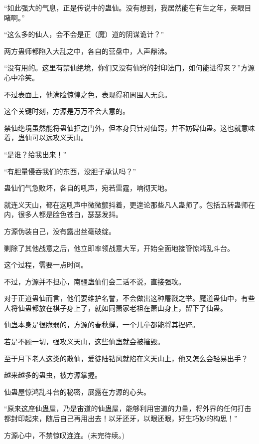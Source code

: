 \begin{this_body}
“如此强大的气息，正是传说中的蛊仙。没有想到，我居然能在有生之年，亲眼目睹啊。”

“这么多的仙人，会不会是正（魔）道的阴谋诡计？”

两方蛊师都陷入大乱之中，各自的营盘中，人声鼎沸。

“没有用的。这里有禁仙绝境，你们又没有仙窍的封印法门，如何能进得来？”方源心中冷笑。

不过表面上，他满脸惊惶之色，表现得和周围人无意。

这个关键时刻，方源是万万不会大意的。

禁仙绝境虽然能将蛊仙拒之门外，但本身只针对仙窍，并不妨碍仙蛊。这也就意味着，蛊仙可以远攻义天山。

“是谁？给我出来！”

“有胆量侵吞我们的东西，没胆子承认吗？”

蛊仙们气急败坏，各自的吼声，宛若雷霆，响彻天地。

就连义天山，都在这吼声中微微颤抖着，更遑论那些凡人蛊师了。包括五转蛊师在内，很多人都是脸色苍白，瑟瑟发抖。

方源伪装自己，没有露出丝毫破绽。

剿除了其他战意之后，他立即率领战意大军，开始全面地接管惊鸿乱斗台。

这个过程，需要一点时间。

不过，方源并不担心，南疆蛊仙们会二话不说，直接强攻。

对于正道蛊仙而言，他们要维护名誉，不会做出这种屠戮之举。魔道蛊仙中，有些人将仙蛊都放在棋子身上了，就如同萧家老祖在萧山身上，留下了仙蛊。

仙蛊本身是很脆弱的，方源的春秋蝉，一个儿童都能将其捏碎。

若是不顾一切，强攻义天山，这些仙蛊就会被摧毁。

至于月下老人这类的散仙，爱徒陆钻风就陷在义天山上，他又怎么会轻易出手？

越来越多的蛊虫，被方源掌握。

仙蛊屋惊鸿乱斗台的秘密，展露在方源的心头。

“原来这座仙蛊屋，乃是宙道的仙蛊屋，能够利用宙道的力量，将外界的任何打击都封印起来，随后自己再用出去！以牙还牙，以眼还眼，好生巧妙的构思！”

方源心中，不禁惊叹连连。(未完待续。)

\end{this_body}

